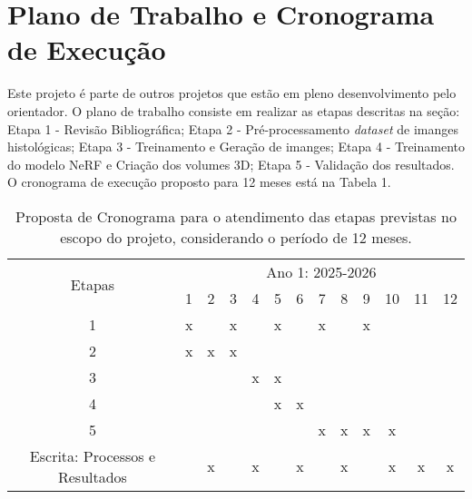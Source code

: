 \section{Plano de Trabalho e Cronograma de Execução}


Este projeto é parte de outros projetos que estão em pleno desenvolvimento pelo orientador. O plano de trabalho consiste em realizar as etapas descritas na seção: Etapa 1 - Revisão Bibliográfica; Etapa 2 - Pré-processamento \textit{dataset} de imanges histológicas; Etapa 3 - Treinamento e Geração de imanges; Etapa 4 - Treinamento do modelo NeRF e Criação dos volumes 3D; Etapa 5 - Validação dos resultados. O cronograma de execução proposto para 12 meses está na Tabela 1. 

\begin{table}[h]

\caption{Proposta de Cronograma para o atendimento das etapas previstas no escopo do projeto, considerando o período de 12 meses.}

\label{tab:cronograma}
	\centering
		\begin{tabular} {|c|c|c|c|c|c|c|c|c|c|c|c|c|}
		\hline
		\multirow{2}{*}{Etapas}
		&\multicolumn{12}{c|}{Ano 1: 2025-2026}\\ \cline{2-13}
		&1&2&3&4&5&6&7&8&9&10&11&12\\
		\hline
		1&x&&x&&x&&x&&x&&&\\
		\hline
		2&x&x&x&&&&&&&&&\\
		\hline	
		3&&&&x&x&&&&&&&\\
		\hline			
		4&&&&&x&x&&&&&&\\
		\hline	
		5&&&&&&&x&x&x&x&&\\
		\hline	
		

		Escrita: Processos e Resultados&&x&&x&&x&&x&&x&x&x\\
		\hline
		\end{tabular}
\end{table}
